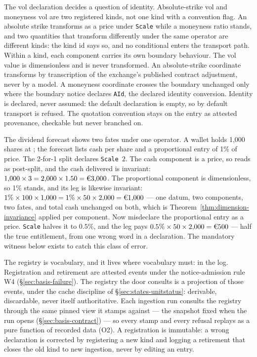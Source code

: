The vol declaration decides a question of identity. Absolute-strike vol and
moneyness vol are two registered kinds, not one kind with a convention flag.
An absolute strike transforms as a price under \texttt{Scale} while a
moneyness ratio stands, and two quantities that transform differently under
the same operator are different kinds: the kind id says so, and no
conditional enters the transport path. Within a kind, each component carries
its own boundary behaviour. The vol value is dimensionless and is never
transformed. An absolute-strike coordinate transforms by transcription of the
exchange's published contract adjustment, never by a model. A moneyness
coordinate crosses the boundary unchanged only where the boundary notice declares
\texttt{AId}, the declared identity conversion. Identity is declared, never
assumed: the default declaration is empty, so by default transport is
refused. The quotation convention stays on the entry as
attested provenance, checkable but never branched on.

The dividend forecast shows two fates under one operator. A wallet holds 1{,}000
shares at ; the forecast lists  cash per share and a proportional
entry of 1\% of price. The 2-for-1 split declares \texttt{Scale}~$2$. The
cash component is a price, so  reads as  post-split, and the cash
delivered is invariant: $1{,}000\times3 = 2{,}000\times1.50 = \EUR{3{,}000}$. The
proportional component is dimensionless, so 1\% stands, and its leg is likewise
invariant: $1\%\times100\times1{,}000 = 1\%\times50\times2{,}000 = \EUR{1{,}000}$
--- one datum, two components, two fates, and total cash unchanged on both, which is
Theorem~\ref{thm:dimension-invariance} applied per component. Now misdeclare the
proportional entry as a price. \texttt{Scale} halves it to $0.5\%$, and the leg pays
$0.5\%\times50\times2{,}000 = \EUR{500}$ --- half the true entitlement, from one
wrong word in a declaration. The mandatory witness below exists to catch this
class of error.

The registry is vocabulary, and it lives where vocabulary must: in the log.
Registration and retirement are attested events under the notice-admission
rule W4 (\S\ref{sec:basis-failure}). The registry the door consults is a
projection of those events, under the cache discipline of
\S\ref{sec:states-unitstatus}: derivable, discardable, never itself
authoritative. Each ingestion run consults the registry through the same
pinned view it stamps against --- the snapshot fixed when the run opens
(\S\ref{sec:basis-contract}) --- so every stamp and every refusal replays as
a pure function of recorded data (O2). A registration is immutable: a wrong
declaration is corrected by registering a new kind and logging a retirement
that closes the old kind to new ingestion, never by editing an entry.

